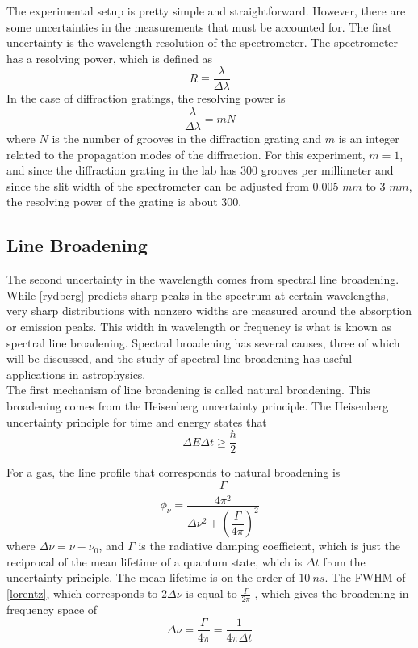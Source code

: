 \documentclass[11pt,letterpaper]{article}
\begin{document}
The experimental setup is pretty simple and straightforward. However, there are
some uncertainties in the measurements that must be accounted for. The first
uncertainty is the wavelength resolution of the spectrometer. The spectrometer
has a resolving power, which is defined as \cite{HechtOptics}
\begin{equation}
    R \equiv \frac{\lambda}{\Delta\lambda}
\end{equation}
In the case of diffraction gratings, the resolving power is \cite{HechtOptics}
\begin{equation}
    \frac{\lambda}{\Delta\lambda} = mN
\end{equation}
where $N$ is the number of grooves in the diffraction grating and $m$ is an
integer related to the propagation modes of the diffraction. For this
experiment, $m = 1$, and since the diffraction grating in the lab has 300
grooves per millimeter \cite{LabManual} and since the slit width of the
spectrometer can be adjusted from 0.005 $mm$ to 3 $mm$, the resolving power of
the grating is about 300.

\subsection{Line Broadening}

The second uncertainty in the wavelength comes from spectral line broadening.
While \eqref{rydberg} predicts sharp peaks in the spectrum at certain
wavelengths, very sharp distributions with nonzero widths are measured around
the absorption or emission peaks. This width in wavelength or frequency is what
is known as spectral line broadening. Spectral broadening has several causes,
three of which will be discussed, and the study of spectral line broadening has
useful applications in astrophysics. \\

The first mechanism of line broadening is called natural broadening. This
broadening comes from the Heisenberg uncertainty principle. The Heisenberg
uncertainty principle for time and energy states that
\begin{equation}
    \Delta E \Delta t \ge \frac{\hbar}{2}
\end{equation}

For a gas, the line profile that corresponds to natural broadening is
\cite{StellarAstro}
\begin{equation}
    \phi_\nu = \frac{\dfrac{\Gamma}{4\pi^2}}{\Delta\nu^2 + 
        \left(\dfrac{\Gamma}{4\pi}\right)^2}
    \label{lorentz}
\end{equation}
where $\Delta \nu = \nu - \nu_0$, and $\Gamma$ is the radiative damping
coefficient, which is just the reciprocal of the mean lifetime of a quantum
state, which is $\Delta t$ from the uncertainty principle. The mean lifetime is
on the order of $10\ ns$. The FWHM of \eqref{lorentz}, which corresponds to
$2\Delta \nu$ is equal to $\frac{\Gamma}{2\pi}$ \cite{StellarAstro}, which gives
the broadening in frequency space of 
\begin{equation}
    \Delta \nu = \frac{\Gamma}{4\pi} = \frac{1}{4\pi\Delta t}
    \label{natbrdnu}
\end{equation}
\end{document}
